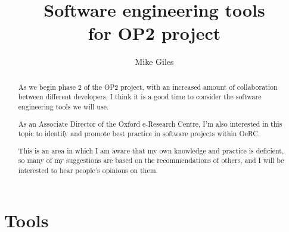 \documentclass[12pt]{article}
\begin{document}
\title{Software engineering tools\\for OP2 project}
\author{Mike Giles}


\maketitle

\begin{abstract}
As we begin phase 2 of the OP2 project, with an increased 
amount of collaboration between different developers, I think
it is a good time to consider the software engineering tools
we will use.

As an Associate Director of the Oxford e-Research Centre,
I'm also interested in this topic to identify and promote
best practice in software projects within OeRC.

This is an area in which I am aware that my own knowledge
and practice is deficient, so many of my suggestions are 
based on the recommendations of others, and I will be 
interested to hear people's opinions on them.

\end{abstract}


\section*{Tools}
\end{document}
